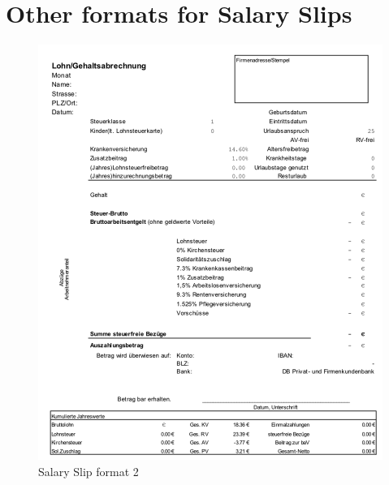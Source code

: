 \section{Other formats for Salary Slips}
\begin{figure}[H]
\centering
\includegraphics[scale=0.6]{images/GA-Formats/ga-format-2.png}
\caption{Salary Slip format 2}
\label{ls_format2}
\end{figure}
